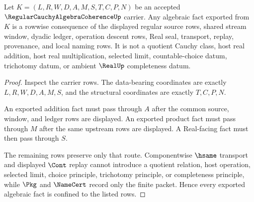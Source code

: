 \begin{theorem}
\label{thm:regular-cauchy-algebra-coherence-nonescape}
Let $K=(L,R,W,D,A,M,S,T,C,P,N)$ be an accepted $\RegularCauchyAlgebraCoherenceUp$ carrier. Any algebraic fact exported from $K$ is a rowwise consequence of the displayed regular source rows, shared stream window, dyadic ledger, operation descent rows, Real seal, transport, replay, provenance, and local naming rows. It is not a quotient Cauchy class, host real addition, host real multiplication, selected limit, countable-choice datum, trichotomy datum, or ambient $\RealUp$ completeness datum.
\end{theorem}
\begin{proof}
Inspect the carrier rows. The data-bearing coordinates are exactly $L,R,W,D,A,M,S$, and the structural coordinates are exactly $T,C,P,N$.

An exported addition fact must pass through $A$ after the common source, window, and ledger rows are displayed. An exported product fact must pass through $M$ after the same upstream rows are displayed. A Real-facing fact must then pass through $S$.

The remaining rows preserve only that route. Componentwise $\hsame$ transport and displayed $\Cont$ replay cannot introduce a quotient relation, host operation, selected limit, choice principle, trichotomy principle, or completeness principle, while $\Pkg$ and $\NameCert$ record only the finite packet. Hence every exported algebraic fact is confined to the listed rows.
\end{proof}


